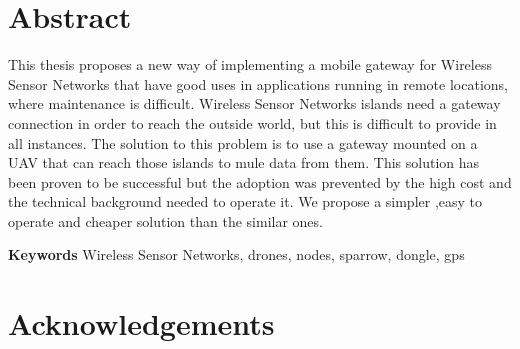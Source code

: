 \chapter*{Abstract}

This thesis proposes a new way of implementing a mobile gateway for Wireless Sensor Networks that have good uses in applications running in remote locations, where maintenance is difficult. Wireless Sensor Networks islands need a gateway connection in order to reach the outside world, but this is difficult to provide in all instances. The solution to this problem is to use a gateway mounted on a UAV that can reach those islands to mule data from them. 
This solution has been proven to be successful but the adoption was prevented by the high cost and the technical background needed to operate it. We propose a simpler ,easy to operate and cheaper solution than the similar ones.





\textbf{Keywords} Wireless Sensor Networks, drones, nodes, sparrow, dongle, gps

\chapter*{Acknowledgements}

 



